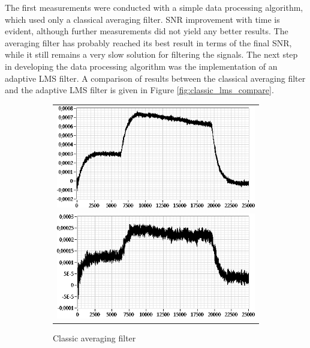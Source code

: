 \documentclass{standalone}
\begin{document}
The first measurements were conducted with a simple data processing algorithm, which used only a classical averaging filter. SNR improvement with time is evident, although further measurements did not yield any better results. The averaging filter has probably reached its best result in terms of the final SNR, while it still remains a very slow solution for filtering the signals. The next step in developing the data processing algorithm was the implementation of an adaptive LMS filter. A comparison of results between the classical averaging filter and the adaptive LMS filter is given in Figure \ref{fig:classic_lms_compare}.
\begin{figure}[h]
	\centering
	\begin{subfigure}[b]{0.49\textwidth}
		\begin{tabular}{c}
			\includegraphics[width=\textwidth]{classic_lms_compare_stokes_classic.png} \\
			\includegraphics[width=\textwidth]{classic_lms_compare_antistokes_classic.png}
		\end{tabular}
		\caption{Classic averaging filter}
	\end{subfigure}
	\begin{subfigure}[b]{0.49\textwidth}

\end{subfigure}
\end{figure}
\end{document}
